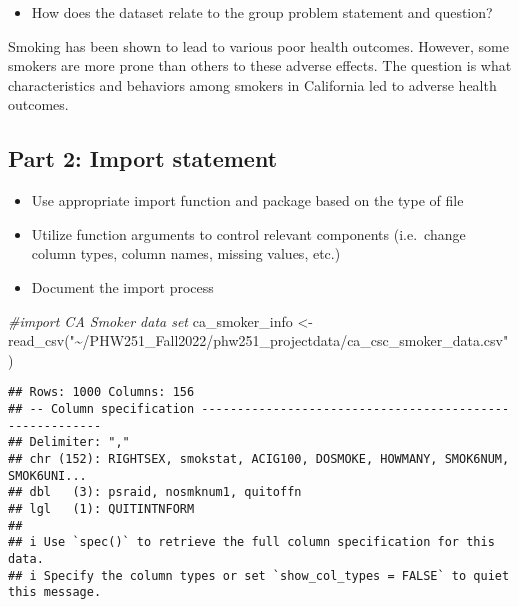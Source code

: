 \documentclass[
]{article}
\newenvironment{Shaded}{\begin{snugshade}}{\end{snugshade}}
\newcommand{\CommentTok}[1]{\textcolor[rgb]{0.56,0.35,0.01}{\textit{#1}}}
\newcommand{\FunctionTok}[1]{\textcolor[rgb]{0.00,0.00,0.00}{#1}}
\newcommand{\NormalTok}[1]{#1}
\newcommand{\OtherTok}[1]{\textcolor[rgb]{0.56,0.35,0.01}{#1}}
\newcommand{\StringTok}[1]{\textcolor[rgb]{0.31,0.60,0.02}{#1}}
\providecommand{\tightlist}{%
  \setlength{\itemsep}{0pt}\setlength{\parskip}{0pt}}
\begin{document}
\begin{itemize}
\tightlist
\item
  How does the dataset relate to the group problem statement and
  question? \n
\end{itemize}

Smoking has been shown to lead to various poor health outcomes. However,
some smokers are more prone than others to these adverse effects. The
question is what characteristics and behaviors among smokers in
California led to adverse health outcomes.

\newpage

\hypertarget{part-2-import-statement}{%
\subsection{\texorpdfstring{Part 2: Import statement
\n}{Part 2: Import statement }}\label{part-2-import-statement}}

\begin{itemize}
\tightlist
\item
  Use appropriate import function and package based on the type of file
  \n
\item
  Utilize function arguments to control relevant components (i.e.~change
  column types, column names, missing values, etc.) \n
\item
  Document the import process \n
\end{itemize}

\begin{Shaded}
\begin{Highlighting}[]
\CommentTok{\#import CA Smoker data set}
\NormalTok{ca\_smoker\_info }\OtherTok{\textless{}{-}} \FunctionTok{read\_csv}\NormalTok{(}\StringTok{"\textasciitilde{}/PHW251\_Fall2022/phw251\_projectdata/ca\_csc\_smoker\_data.csv"}\NormalTok{)}
\end{Highlighting}
\end{Shaded}

\begin{verbatim}
## Rows: 1000 Columns: 156
## -- Column specification --------------------------------------------------------
## Delimiter: ","
## chr (152): RIGHTSEX, smokstat, ACIG100, DOSMOKE, HOWMANY, SMOK6NUM, SMOK6UNI...
## dbl   (3): psraid, nosmknum1, quitoffn
## lgl   (1): QUITINTNFORM
## 
## i Use `spec()` to retrieve the full column specification for this data.
## i Specify the column types or set `show_col_types = FALSE` to quiet this message.
\end{verbatim}
\end{document}
